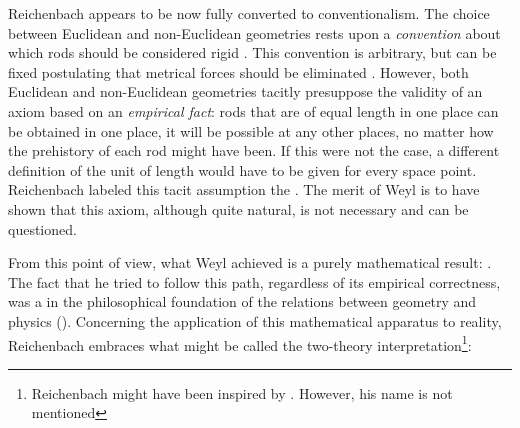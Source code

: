 \documentclass[final]{article}
\begin{document}
Reichenbach appears to be now fully converted to conventionalism. The choice between Euclidean and non-Euclidean geometries rests upon a \emph{convention} about which rods should be considered rigid \citep[366]{Reichenbach1922a}. This convention is arbitrary, but can be fixed postulating that metrical forces should be eliminated \citep{Reichenbach1922}. However, both Euclidean and non-Euclidean geometries tacitly presuppose the validity of an axiom based on an \emph{empirical fact}: rods that are of equal length in one place can be obtained in one place, it will be possible at any other places, no matter how the prehistory of each rod might have been. If this were not the case, a different definition of the unit of length would have to be given for every space point. Reichenbach labeled this tacit assumption the  \citep[366]{Reichenbach1922a}. The merit of Weyl is to have shown that this axiom, although quite natural, is not necessary and can be questioned. 

From this point of view, what Weyl achieved is a purely mathematical result:  \citep[365]{Reichenbach1922a}. The fact that he tried to follow this path, regardless of its empirical correctness, was a  in the philosophical foundation of the relations between geometry and physics (\citealp[367f.]{Reichenbach1921}). Concerning the application of this mathematical apparatus to reality, Reichenbach embraces what might be called the two-theory interpretation\footnote{Reichenbach might have been inspired by \citet{Pauli1921}. However, his name is not mentioned}:
\end{document}
